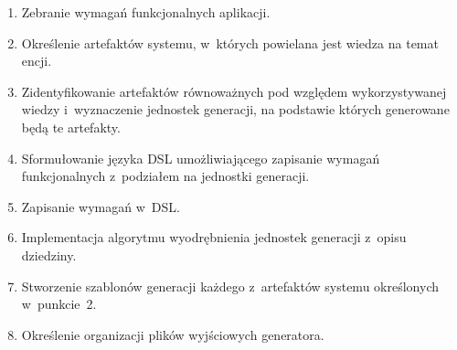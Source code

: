 \begin{enumerate}
 \item Zebranie wymagań funkcjonalnych aplikacji.
 \item Określenie artefaktów systemu, w~których powielana jest wiedza na temat encji.
 \item Zidentyfikowanie artefaktów równoważnych pod względem wykorzystywanej wiedzy i~wyznaczenie jednostek generacji, na podstawie których generowane będą te artefakty.
 \item Sformułowanie języka DSL umożliwiającego zapisanie wymagań funkcjonalnych z~podziałem na jednostki generacji.
 \item Zapisanie wymagań w~DSL.
 \item Implementacja algorytmu wyodrębnienia jednostek generacji z~opisu dziedziny.
 \item Stworzenie szablonów generacji każdego z~artefaktów systemu określonych w~punkcie~2.
 \item Określenie organizacji plików wyjściowych generatora.
\end{enumerate}